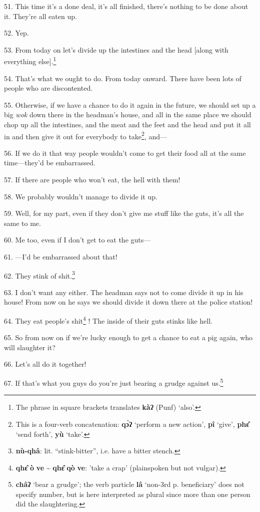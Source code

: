 51. This time it's a done deal, it's all finished, there's nothing to be done about
it. They're all eaten up.

52. Yep.

53. From today on let's divide up the intestines and the head [along with everything
else].\footnote{The phrase in square brackets translates \textbf{kàʔ} (Punf) `also'.}

54. That's what we ought to do. From today onward. There have been lots of people
who are discontented.

55. Otherwise, if we have a chance to do it again in the future, we should set
up a big \textit{wok} down there in the headman's house, and all in the same place
we should chop up all the intestines, and the meat and the feet and the head and
put it all in and then give it out for everybody to take\footnote{This is a four-verb concatenation: \textbf{qɔ̀ʔ} `perform a new action', \textbf{pî} `give', \textbf{phɛ̂} `send forth', \textbf{yù} `take'.}, and---

56. If we do it that way people wouldn't come to get their food all at the same
time---they'd be embarrassed.

57. If there are people who won't eat, the hell with them!

58. We probably wouldn't manage to divide it up.

59. Well, for my part, even if they don't give me stuff like the guts, it's all
the same to me.

60. Me too, even if I don't get to eat the guts---

61. ---I'd be embarrassed about that!

62. They stink of shit.\footnote{\textbf{nù-qhâ}: lit. ``stink-bitter'', i.e. have a bitter stench.}

63. I don't want any either. The headman says not to come divide it up in his house!
From now on he says we should divide it down there at the police station!

64. They eat people's shit\footnote{\textbf{qhɛ̂} \textbf{ò} \textbf{ve} \textasciitilde{} \textbf{qhɛ̂} \textbf{qò} \textbf{ve}: 'take a crap' (plainspoken but not vulgar).} ! The inside of their
guts stinks like hell.

65. So from now on if we're lucky enough to get a chance to eat a pig again, who
will slaughter it?

66. Let's all do it together!

67. If that's what you guys do you're just bearing a grudge against us.\footnote{\textbf{châʔ} `bear a grudge'; the verb particle \textbf{lâ} `non-3rd p. beneficiary' does not specify number, but is here interpreted as plural since more than one person did the slaughtering.}


